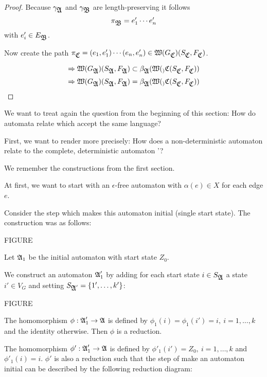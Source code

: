 \begin{proof}
Because $\gamma_{\mbox{$\mathfrak{A}$}}$ and $\gamma_{\mbox{$\mathfrak{B}$}}$ are length-preserving it follows
\[ \pi_{\mbox{$\mathfrak{B}$}} = e'_1 \cdots e'_n \]
with $e'_i \in E_{\mbox{$\mathfrak{B}$}}$.

Now create the path $\pi_{\mbox{$\mathfrak{C}$}} = (e_1, e'_1) \cdots (e_n, e'_n) \in
\mbox{$\mathfrak{W}(G_{\mbox{$\mathfrak{C}$}})$}(S_{\mbox{$\mathfrak{C}$}}, F_{\mbox{$\mathfrak{C}$}})$.

\[ \Rightarrow \mbox{$\mathfrak{W}(G_{\mbox{$\mathfrak{A}$}})$}(S_{\mbox{$\mathfrak{A}$}}, F_{\mbox{$\mathfrak{A}$}}) \subset
\beta_{\mbox{$\mathfrak{A}$}}(\mbox{$\mathfrak{W}(_)$}{\mbox{$\mathfrak{C}$}}(S_{\mbox{$\mathfrak{C}$}}, F_{\mbox{$\mathfrak{C}$}})) \]
\[ \Rightarrow \mbox{$\mathfrak{W}(G_{\mbox{$\mathfrak{A}$}})$}(S_{\mbox{$\mathfrak{A}$}}, F_{\mbox{$\mathfrak{A}$}}) =
\beta_{\mbox{$\mathfrak{A}$}}(\mbox{$\mathfrak{W}(_)$}{\mbox{$\mathfrak{C}$}}(S_{\mbox{$\mathfrak{C}$}}, F_{\mbox{$\mathfrak{C}$}})) \]
\end{proof}

We want to treat again the question from the beginning of this section: How do
automata relate which accept the same language?

First, we want to render more precisely: How does a non-deterministic automaton
 relate to the complete, deterministic automaton '?

We remember the constructions from the first section.

At first, we want to start with an $\epsilon$-free automaton with $\alpha(e)
\in X$ for each edge $e$.

Consider the step which makes this automaton initial (single start state). The
construction was as follows:

FIGURE

Let $\mbox{$\mathfrak{A}$}_1$ be the initial automaton with start state $Z_0$.

We construct an automaton $\mbox{$\mathfrak{A}$}'_1$ by adding for each start state $i \in
S_{\mbox{$\mathfrak{A}$}}$ a state $i' \in V_G$ and setting $S_{\mbox{$\mathfrak{A}$}'} = \{ 1', \ldots, k'
\}$:

FIGURE

The homomorphism $\phi : \mbox{$\mathfrak{A}$}'_1 \to \mbox{$\mathfrak{A}$}$ is defined by $\phi_1(i) =
\phi_1(i') = i,\ i = 1, \ldots, k$ and the identity otherwise. Then $\phi$ is a
reduction.

The homomorphism $\phi' : \mbox{$\mathfrak{A}$}_1' \to \mbox{$\mathfrak{A}$}$ is defined by $\phi'_1(i') =
Z_0,\ i = 1, \ldots, k$ and $\phi'_1(i) = i$. $\phi'$ is also a reduction such
that the step of make an automaton initial can be described by the following
reduction diagram:

\begin{center}
\end{center}

